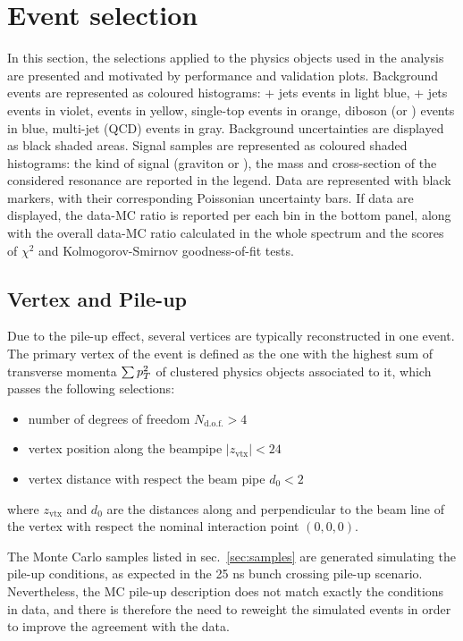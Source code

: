 \section{Event selection}
\label{sec:objects}

In this section, the selections applied to the physics objects used in the analysis are presented and motivated by performance and validation plots. Background events are represented as coloured histograms: \Z + jets events in light blue, \W + jets events in violet, \ttbar events in yellow, single-top events in orange, diboson (or \VV) events in blue, multi-jet (QCD) events in gray. Background uncertainties are displayed as black shaded areas. Signal samples are represented as coloured shaded histograms: the kind of signal (graviton or \Wp), the mass and cross-section of the considered resonance are reported in the legend. Data are represented with black markers, with their corresponding Poissonian uncertainty bars. If data are displayed, the data-MC ratio is reported per each bin in the bottom panel, along with the overall data-MC ratio calculated in the whole spectrum and the scores of $\chi^2$ and Kolmogorov-Smirnov goodness-of-fit tests.

\subsection{Vertex and Pile-up}
Due to the pile-up effect, several vertices are typically reconstructed in one event. The primary vertex of the event is defined as the one with the highest sum of transverse momenta $\sum p_T^2$ of clustered physics objects associated to it, which passes the following selections:
\begin{itemize}
  \item number of degrees of freedom $N_{\text{d.o.f.}}>4$
  \item vertex position along the beampipe $|z_{\text{vtx}}|<24$ \cm
  \item vertex distance with respect the beam pipe $d_0<2$ \cm
\end{itemize}
where $z_{\text{vtx}}$ and $d_0$ are the distances along and perpendicular to the beam line of the vertex with respect the nominal interaction point $(0,0,0)$.

\noindent The Monte Carlo samples listed in sec.~\ref{sec:samples} are generated simulating the pile-up conditions, as expected in the 25 ns bunch crossing pile-up scenario. Nevertheless, the MC pile-up description does not match exactly the conditions in data, and there is therefore the need to reweight the simulated events in order to improve the agreement with the data. 

